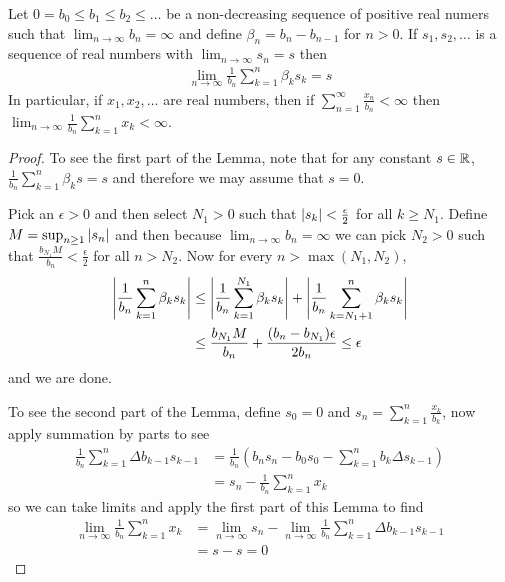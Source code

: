 \begin{lem}\label{SeriesAndAverages}Let $0=b_0 \leq b_1 \leq b_2 \leq \dots$ be a non-decreasing
  sequence of positive real numers such that $\lim_{n \to \infty} b_n
  = \infty$ and define $\beta_n = b_n - b_{n-1}$ for $n > 0$.  If
  $s_1, s_2, \dots$ is a sequence of real numbers with $\lim_{n \to
    \infty} s_n = s$ then
\begin{align*}
\lim_{n \to \infty} \frac{1}{b_n} \sum_{k=1}^n \beta_k s_k = s
\end{align*}
In particular, if $x_1, x_2, \dots$ are real numbers, then if $\sum_{n=1}^\infty
\frac{x_n}{b_n} < \infty$ then $\lim_{n \to \infty}
\frac{1}{b_n}\sum_{k=1}^n x_k < \infty$.
\end{lem}
\begin{proof}
To see the first part of the Lemma, note that for any constant $s \in
\mathbb{R}$,  $\frac{1}{b_n}\sum_{k=1}^n \beta_k s = s$ and therefore we
may assume that $s=0$.

Pick an $\epsilon >0$ and then select $N_1 >0$ such that $\left \vert s_k \right \vert <
\frac{\epsilon}{2}$ for all $k \geq N_1$.  Define $M = \sup_{n\geq 1}
\left \vert s_n \right \vert$ and then because $\lim_{n \to \infty} b_n = \infty$ we can pick $N_2 >
0$ such that $\frac{b_{N_1} M }{b_n} < \frac{\epsilon}{2}$ for all $n > N_2$.
Now for every $n > \max(N_1, N_2)$,
\begin{align*}
\left \vert \frac{1}{b_n} \sum_{k=1}^n \beta_k s_k \right \vert &\leq \left \vert \frac{1}{b_n}
  \sum_{k=1}^{N_1} \beta_k s_k \right \vert + \left \vert \frac{1}{b_n}
  \sum_{k=N_1+1}^n \beta_k s_k \right \vert \\
&\leq \frac{b_{N_1} M }{b_n} + \frac{(b_n - b_{N_1})\epsilon }{2b_n} \leq \epsilon
\end{align*}
and we are done.

To see the second part of the Lemma, define $s_0 = 0$ and $s_n =
\sum_{k=1}^n \frac{x_k}{b_k}$, now apply summation by parts to see
\begin{align*}
\frac{1}{b_n} \sum_{k=1}^n \Delta b_{k-1} s_{k-1} &= \frac{1}{b_n}
\left ( b_n s_n - b_0 s_0 - \sum_{k=1}^n b_k \Delta s_{k-1} \right )
\\
&= s_n - \frac{1}{b_n} \sum_{k=1}^n x_k
\end{align*}
so we can take limits and apply the first part of this Lemma to find
\begin{align*}
\lim_{n \to \infty} \frac{1}{b_n} \sum_{k=1}^n x_k
&= \lim_{n \to \infty} s_n - \lim_{n \to \infty} \frac{1}{b_n}
\sum_{k=1}^n \Delta b_{k-1} s_{k-1} \\
&= s - s = 0
\end{align*}
\end{proof}

